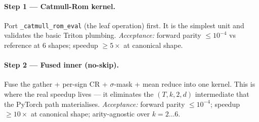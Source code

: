 \documentclass[11pt,a4paper]{article}
\begin{document}
\begin{center}
\end{center}

\paragraph{Step 1 — Catmull-Rom kernel.}
Port \texttt{\_catmull\_rom\_eval} (the leaf operation) first. It is the simplest unit and validates the basic Triton plumbing.
\textit{Acceptance:} forward parity $\le 10^{-4}$ vs reference at 6 shapes; speedup $\ge 5\times$ at canonical shape.

\paragraph{Step 2 — Fused inner (no-skip).}
Fuse the gather + per-sign CR + $\sigma$-mask + mean reduce into one kernel. This is where the real speedup lives --- it eliminates the $(T, k, 2, d)$ intermediate that the PyTorch path materialises.
\textit{Acceptance:} forward parity $\le 10^{-4}$; speedup $\ge 10\times$ at canonical shape; arity-agnostic over $k=2{\dots}6$.
\end{document}
